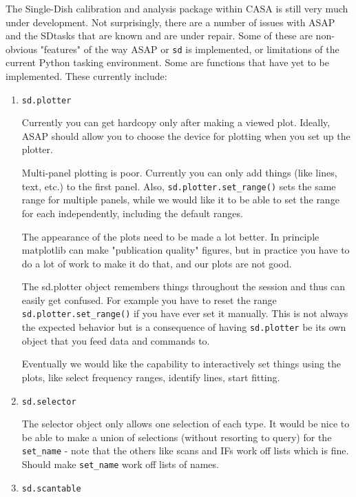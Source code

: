 The Single-Dish calibration and analysis package within CASA is still
very much under development.  Not surprisingly,
there are a number of issues with ASAP and the SDtasks that are known and
are under repair.  Some of these are non-obvious "features" of the way
ASAP or {\tt sd} is implemented, or limitations of the current Python
tasking environment.  Some are functions that have yet to be
implemented.  These currently include: 

\begin{enumerate}

\item {\tt sd.plotter}

  Currently you can get hardcopy only after making a viewed plot.
  Ideally, ASAP should allow you to choose the device for plotting
  when you set up the plotter.

  Multi-panel plotting is poor.  Currently you can only add things
  (like lines, text, etc.) to the first panel.  Also,
  {\tt sd.plotter.set\_range()} sets the same range for multiple panels,
  while we would like it to be able to set the range for each independently,
  including the default ranges.

  The appearance of the plots need to be made a lot better.  In
  principle matplotlib can make "publication quality" figures, but in
  practice you have to do a lot of work to make it do that, and our plots 
  are not good.

  The sd.plotter object remembers things throughout the session
  and thus can easily get confused.  For example you have to
  reset the range {\tt sd.plotter.set\_range()} if you have ever set it
  manually.  This is not always the expected behavior but is a consequence
  of having {\tt sd.plotter} be its own object that you feed data and
  commands to.

  Eventually we would like the capability to interactively set things
  using the plots, like select frequency ranges, identify lines,
  start fitting.

\item {\tt sd.selector}

  The selector object only allows one selection of each type.  It would be 
  nice to be able to make a union of selections (without resorting to query)
  for the {\tt set\_name} - note that the others like scans and IFs work off
  lists which is fine.  Should make {\tt set\_name} work off lists of names.

\item {\tt sd.scantable}


\end{enumerate}
